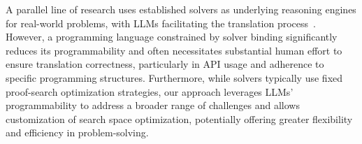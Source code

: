 A parallel line of research uses established solvers as underlying reasoning engines for real-world problems, with LLMs facilitating the translation process~\citep{liu2023llmp,hao2024planningrigorgeneralpurposezeroshot}. However, a programming language constrained by solver binding significantly reduces its programmability and often necessitates substantial human effort to ensure translation correctness, particularly in API usage and adherence to specific programming structures. Furthermore, while solvers typically use fixed proof-search optimization strategies, our approach leverages LLMs' programmability to address a broader range of challenges and allows customization of search space optimization, potentially offering greater flexibility and efficiency in problem-solving. %
